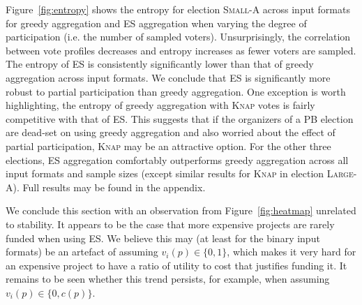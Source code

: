 \documentclass[runningheads]{llncs}
\newcommand{\points}{\textsc{Points}}
\newcommand{\knap}{\textsc{Knap}}
\newcommand{\mes}{ES}
\begin{document}
Figure~\ref{fig:entropy} shows the entropy for election   \textsc{Small-A} across   input formats for greedy aggregation and  \mes{} aggregation when varying the degree of participation (i.e. the number of sampled voters). 
Unsurprisingly, the correlation between vote profiles decreases and entropy increases  as fewer voters are sampled. 
The entropy of \mes{} is consistently significantly lower than that of greedy aggregation across input formats. We conclude that \mes{} is significantly more robust to partial participation than greedy aggregation. One exception is worth highlighting, the entropy of greedy aggregation with \knap{} votes is fairly competitive with that of \mes. This suggests that if the organizers of a PB election are dead-set on using greedy aggregation and also worried about the effect of partial participation,  \knap{} may be an attractive option.  
%
For the other three elections,   \mes{} aggregation comfortably outperforms greedy aggregation across all input formats and sample sizes (except similar results for \knap{} in election \textsc{Large-A}). Full results  may be found in the appendix. 



We conclude this section with an observation from  Figure~\ref{fig:heatmap} unrelated to stability. It appears to be the case that more expensive projects are rarely funded  when using \mes{}.  We believe this may (at least for the binary input formats)  be an artefact of assuming $v_i(p)\in \{0,1\}$, which makes it very hard for an expensive project to have a ratio of utility to cost that justifies funding it. It remains to be seen whether this trend persists, for example, when assuming $v_i(p)\in \{0,c(p)\}$.
\end{document}
